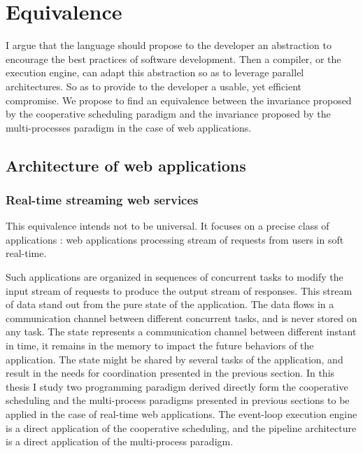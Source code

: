 \section{Equivalence} \label{chapter2:equivalence}

I argue that the language should propose to the developer an abstraction to encourage the best practices of software development.
Then a compiler, or the execution engine, can adapt this abstraction so as to leverage parallel architectures. 
So as to provide to the developer a usable, yet efficient compromise.
We propose to find an equivalence between the invariance proposed by the cooperative scheduling paradigm and the invariance proposed by the multi-processes paradigm in the case of web applications.

\subsection{Architecture of web applications}

\subsubsection{Real-time streaming web services}


This equivalence intends not to be universal.
It focuses on a precise class of applications : web applications processing stream of requests from users in soft real-time.

Such applications are organized in sequences of concurrent tasks to modify the input stream of requests to produce the output stream of responses.
This stream of data stand out from the pure state of the application.
The data flows in a communication channel between different concurrent tasks, and is never stored on any task.
The state represents a communication channel between different instant in time, it remains in the memory to impact the future behaviors of the application.
The state might be shared by several tasks of the application, and result in the needs for coordination presented in the previous section.
In this thesis I study two programming paradigm derived directly form the cooperative scheduling and the multi-process paradigms presented in previous sections to be applied in the case of real-time web applications.
The event-loop execution engine is a direct application of the cooperative scheduling, and the pipeline architecture is a direct application of the multi-process paradigm.

